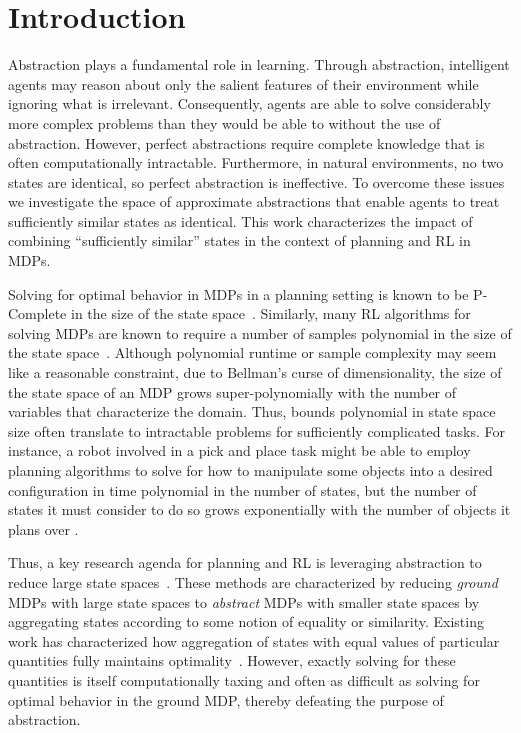\section{Introduction}
Abstraction plays a fundamental role in learning. Through abstraction, intelligent agents may reason about only the salient features of their environment while ignoring what is irrelevant. Consequently, agents are able to solve considerably more complex problems than they would be able to without the use of abstraction. However, perfect abstractions require complete knowledge that is often computationally intractable. Furthermore, in natural environments, no two states are identical, so perfect abstraction is ineffective. To overcome these issues we investigate the space of approximate abstractions that enable agents to treat sufficiently similar states as identical. This work characterizes the impact of combining ``sufficiently similar'' states in the context of planning and \ac{RL} in \acp{MDP}.

Solving for optimal behavior in \acp{MDP} in a planning setting is known to be P-Complete in the size of the state space~\cite{papadimitriou1987complexity,littman1995complexity}. Similarly, many \ac{RL} algorithms for solving \acp{MDP} are known to require a number of samples polynomial in the size of the state space~\cite{strehl2009reinforcement}. Although polynomial runtime or sample complexity may seem like a reasonable constraint, due to Bellman's curse of dimensionality, the size of the state space of an \ac{MDP} grows super-polynomially with the number of variables that characterize the domain. Thus, bounds polynomial in state space size often translate to intractable problems for sufficiently complicated tasks.  For instance, a robot involved in a pick and place task might be able to employ planning algorithms to solve for how to manipulate some objects into a desired configuration in time polynomial in the number of states, but the number of states it must consider to do so grows exponentially with the number of objects it plans over .

Thus, a key research agenda for planning and \ac{RL} is leveraging abstraction to reduce large state spaces~\cite{andre2002state,jong2005state,dietterich2000hierarchical,Bean2011}. These methods are characterized by reducing \textit{ground} MDPs with large state spaces to \textit{abstract} MDPs with smaller state spaces by aggregating states according to some notion of equality or similarity. Existing work has characterized how aggregation of states with equal values of particular quantities fully maintains optimality~\cite{li2006towards,dean1997modelmin}. However, exactly solving for these quantities is itself computationally taxing and often as difficult as solving for optimal behavior in the ground \ac{MDP}, thereby defeating the purpose of abstraction.


